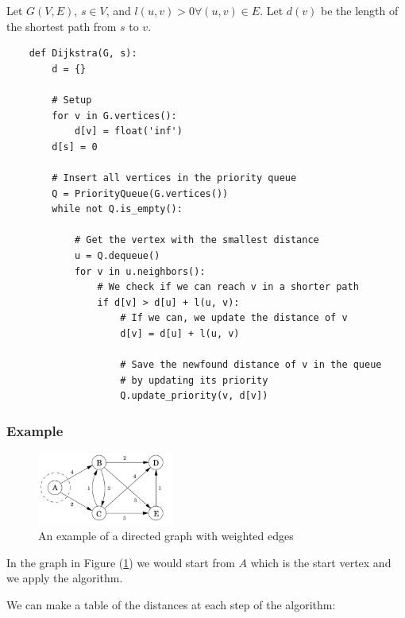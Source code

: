 \documentclass[10pt]{extarticle}
\begin{document}
Let $G(V, E)$, $s \in V$, and $l(u, v) > 0 \forall (u, v) \in E$. Let $d(v)$ be the length of the shortest path from $s$ to $v$.

\begin{verbatim}
    def Dijkstra(G, s):
        d = {}

        # Setup
        for v in G.vertices():
            d[v] = float('inf')
        d[s] = 0

        # Insert all vertices in the priority queue
        Q = PriorityQueue(G.vertices())
        while not Q.is_empty():

            # Get the vertex with the smallest distance
            u = Q.dequeue()
            for v in u.neighbors():
                # We check if we can reach v in a shorter path
                if d[v] > d[u] + l(u, v):
                    # If we can, we update the distance of v
                    d[v] = d[u] + l(u, v)

                    # Save the newfound distance of v in the queue
                    # by updating its priority
                    Q.update_priority(v, d[v])
\end{verbatim}

\subsubsection{Example}

\begin{figure}[H]
    \centering
    \includegraphics[width=0.4\textwidth]{assets/computer_science_2/dijsktra.png}

    \caption{An example of a directed graph with weighted edges}
    \label{fig:weighted_directedgraph}
\end{figure}

In the graph in Figure (\ref{fig:weighted_directedgraph}) we would start from $A$ which is the start vertex and we apply the algorithm.

We can make a table of the distances at each step of the algorithm:
\end{document}
